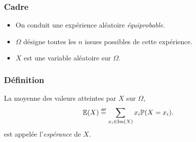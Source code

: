 \documentclass[main.tex]{subfiles}
\begin{document}
\begin{definition}
    [Espérance]

    \subsubsection{Cadre}
    \begin{itemize}
        \item On conduit une expérience aléatoire \emph{équiprobable}.
        \item $\Omega$ désigne toutes les $n$ issues possibles de cette expérience.
        \item $X$ est une variable aléatoire sur $\Omega$.
    \end{itemize}

    \subsubsection{Définition}
    La moyenne des valeurs atteintes par $X$ sur $\Omega$,
    \begin{align}
        \E(X) \defeq \sum_{x_i \in \im(X)} x_i \Pr(X = x_i).
    \end{align}
    est appelée l'\emph{espérance} de $X$.
\end{definition}
\end{document}
